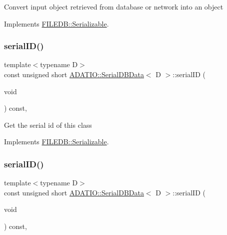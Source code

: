 Convert input object retrieved from database or network into an object 

Implements \mbox{\hyperlink{classFILEDB_1_1Serializable_a21a5831fa4f65790490a8a5eba9fcab2}{F\+I\+L\+E\+D\+B\+::\+Serializable}}.

\mbox{\label{classADATIO_1_1SerialDBData_a513643be38434a570d655602330aade9}} 
\subsubsection{\texorpdfstring{serialID()}{serialID()}\hspace{0.1cm}{\footnotesize\ttfamily [1/3]}}
{\footnotesize\ttfamily template$<$typename D$>$ \\
const unsigned short \mbox{\hyperlink{classADATIO_1_1SerialDBData}{A\+D\+A\+T\+I\+O\+::\+Serial\+D\+B\+Data}}$<$ D $>$\+::serial\+ID (\begin{DoxyParamCaption}\item[{void}]{ }\end{DoxyParamCaption}) const\hspace{0.3cm}{\ttfamily [inline]}, {\ttfamily [virtual]}}

Get the serial id of this class 

Implements \mbox{\hyperlink{classFILEDB_1_1Serializable_a5d639b5dbd5d8ebc7dca1eca31bbc868}{F\+I\+L\+E\+D\+B\+::\+Serializable}}.

\mbox{\label{classADATIO_1_1SerialDBData_a513643be38434a570d655602330aade9}} 
\subsubsection{\texorpdfstring{serialID()}{serialID()}\hspace{0.1cm}{\footnotesize\ttfamily [2/3]}}
{\footnotesize\ttfamily template$<$typename D$>$ \\
const unsigned short \mbox{\hyperlink{classADATIO_1_1SerialDBData}{A\+D\+A\+T\+I\+O\+::\+Serial\+D\+B\+Data}}$<$ D $>$\+::serial\+ID (\begin{DoxyParamCaption}\item[{void}]{ }\end{DoxyParamCaption}) const\hspace{0.3cm}{\ttfamily [inline]}, {\ttfamily [virtual]}}

